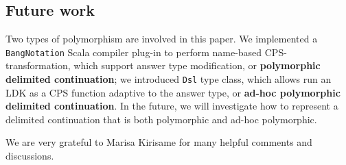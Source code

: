 \subsection{Future work}

Two types of polymorphism are involved in this paper. We implemented a \lstinline{BangNotation} Scala compiler plug-in to perform name-based CPS-transformation, which support answer type modification, or \textbf{polymorphic delimited continuation}; we introduced \lstinline{Dsl} type class, which allows run an LDK as a CPS function adaptive to the answer type, or \textbf{ad-hoc polymorphic delimited continuation}. In the future, we will investigate how to represent a delimited continuation that is both polymorphic and ad-hoc polymorphic.

\clearpage
\appendix

\begin{acks}

We are very grateful to Marisa Kirisame for many helpful comments and discussions.

\end{acks}


